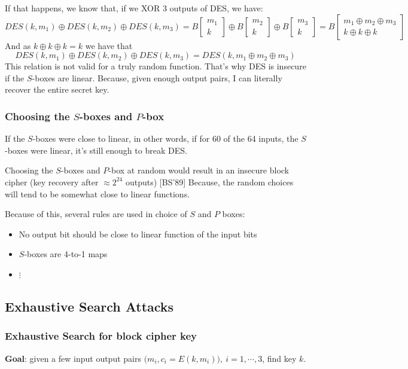 \documentclass[12pt]{book}
\begin{document}
If that happens, we know that, if we XOR 3 outputs of DES, we have:
$$DES(k,m_{1})\oplus DES(k,m_{2})\oplus DES(k,m_{3})=B\left[\begin{array}{c}
	m_{1}\\
	k
\end{array}\right]\oplus B\left[\begin{array}{c}
m_{2}\\
k
\end{array}\right]\oplus B\left[\begin{array}{c}
m_{3}\\
k
\end{array}\right]=B\left[\begin{array}{c}
m_{1}\oplus m_{2}\oplus m_{3}\\
k\oplus k\oplus k
\end{array}\right]$$And as $k\oplus k\oplus k=k$ we have that
$$DES(k,m_{1})\oplus DES(k,m_{2})\oplus DES(k,m_{3})=DES(k,m_{1}\oplus m_{2}\oplus m_{3})$$This relation is not valid for a truly random function. That's why DES is insecure if the $S$-boxes are linear. Because, given enough output pairs, I can literally recover the entire secret key.

\subsubsection{Choosing the $S$-boxes and $P$-box}
If the $S$-boxes were close to linear, in other words, if for 60 of the 64 inputs, the $S$-boxes were linear, it's still enough to break DES.

Choosing the $S$-boxes and $P$-box at random would result in an insecure block cipher (key recovery after $\approx2^{24}$ outputs) [BS'89] Because, the random choices will tend to be somewhat close to linear functions.

Because of this, several rules are used in choice of $S$ and $P$ boxes:
\begin{itemize}
	\item No output bit should be close to linear function of the input bits
	\item $S$-boxes are 4-to-1 maps
	\item[] $\vdots$
\end{itemize}

\subsection{Exhaustive Search Attacks}
\subsubsection{Exhaustive Search for block cipher key}
\textbf{Goal}: given a few input output pairs $\big(m_{i},c_{i}=E(k,m_{i})\big),\ i=1,\cdots,3$, find key $k$.
\end{document}
